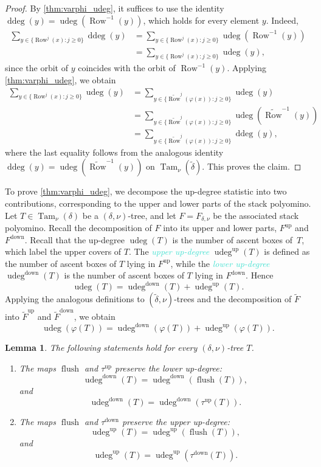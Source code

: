 \documentclass[11pt]{amsart}
\newcommand{\altTam}[2]{\operatorname{Tam}_{#1}(#2)}
\newcommand{\up}{^{\operatorname{up}}}
\newcommand{\down}{^{\operatorname{down}}}
\DeclareMathOperator{\row}{Row}
\DeclareMathOperator{\flush}{flush}
\DeclareMathOperator{\ddeg}{ddeg}
\DeclareMathOperator{\udeg}{udeg}
\newcommand{\dfn}[1]{\textcolor{Turquoise}{\emph{#1}}}
\newtheorem{lemma}[theorem]{Lemma}
\theoremstyle{definition}
\begin{document}
\begin{proof}
By \cref{thm:varphi_udeg}, it suffices to use the identity $\ddeg(y)=\udeg(\row^{-1}(y))$, which holds for every element $y$. Indeed,
\begin{align*}
\sum_{y \in \{\row^j(x)\colon j\ge 0\}} \ddeg(y) &= \sum_{y \in \{\row^j(x)\colon j\ge 0\}} \udeg(\row^{-1}(y)) \\
&= \sum_{y \in \{\row^j(x)\colon j\ge 0\}} \udeg(y),
\end{align*}
since the orbit of $y$ coincides with the orbit of $\row^{-1}(y)$. Applying \cref{thm:varphi_udeg}, we obtain
\begin{align*}
\sum_{y \in \{\row^j(x)\colon j\ge 0\}} \udeg(y) &= \sum_{y \in \{\widetilde{\row}^j(\varphi(x))\colon j\ge 0\}} \udeg(y) \\
&= \sum_{y \in \{\widetilde{\row}^j(\varphi(x))\colon j\ge 0\}} \udeg(\widetilde{\row}^{-1}(y)) \\
&= \sum_{y \in \{\widetilde{\row}^j(\varphi(x))\colon j\ge 0\}} \ddeg(y),
\end{align*}
where the last equality follows from the analogous identity $\ddeg(y)= \udeg(\widetilde{\row}^{-1}(y))$ on $\altTam{\nu}{\widetilde{\delta}}$. This proves the claim.
\end{proof}

To prove \cref{thm:varphi_udeg}, we decompose the up-degree statistic into two contributions, corresponding to the upper and lower parts of the stack polyomino. Let $T\in \altTam{\nu}{\delta}$ be a $(\delta,\nu)$-tree, and let $F=F_{\delta,\nu}$ be the associated stack polyomino. Recall the decomposition of $F$ into its upper and lower parts, $F\up$ and $F\down$. Recall that the up-degree $\udeg(T)$ is the number of ascent boxes of~$T$, which label the upper covers of $T$. The \dfn{upper up-degree} $\udeg\up(T)$ is defined as the number of ascent boxes of $T$ lying in $F\up$, while the \dfn{lower up-degree} $\udeg\down(T)$ is the number of ascent boxes of $T$ lying in $F\down$. Hence
\[\udeg(T) = \udeg\down(T) + \udeg\up(T).\]
Applying the analogous definitions to $(\widetilde{\delta},\nu)$-trees and the decomposition of $\widetilde F$ into $\widetilde F\up$ and $\widetilde F\down$, we obtain
\[\udeg(\varphi(T)) = \udeg\down(\varphi(T)) + \udeg\up(\varphi(T)).\]

\begin{lemma} \label{lem:udeg_invariance}
The following statements hold for every $(\delta,\nu)$-tree $T$.
\begin{enumerate}
\item \label{item:udeg_invariance_down} The maps $\flush$ and $\tau\up$ preserve the lower up-degree:
\[\udeg\down(T) = \udeg\down(\flush(T)),\]
and
\[\udeg\down(T) = \udeg\down(\tau\up(T)).\]
\item \label{item:udeg_invariance_up} The maps $\flush$ and $\tau\down$ preserve the upper up-degree:
\[\udeg\up(T) = \udeg\up(\flush(T)),\]
and
\[\udeg\up(T) = \udeg\up(\tau\down(T)).\]
\end{enumerate}
\end{lemma}
\end{document}
